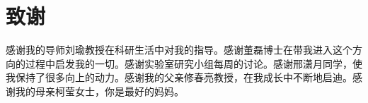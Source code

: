 
\chapter{致谢}

感谢我的导师刘瑜教授在科研生活中对我的指导。感谢董磊博士在带我进入这个方向的过程中启发我的一切。感谢实验室研究小组每周的讨论。感谢邢潇月同学，使我保持了很多向上的动力。感谢我的父亲修春亮教授，在我成长中不断地启迪。感谢我的母亲柯莹女士，你是最好的妈妈。
